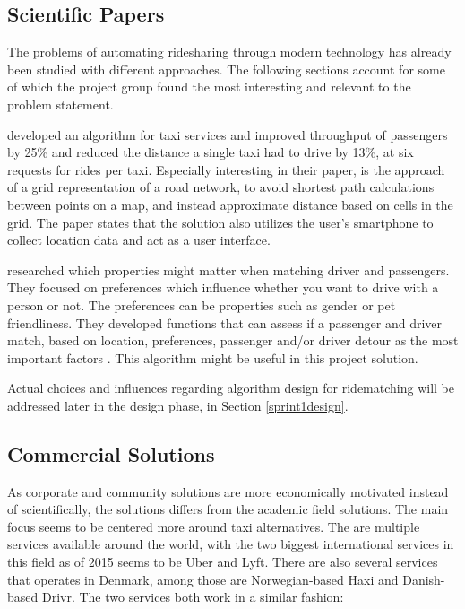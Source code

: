 \subsection{Scientific Papers}
The problems of automating ridesharing through modern technology has already been studied with different approaches.
The following sections account for some of which the project group found the most interesting and relevant to the problem statement. 


\citet{ShuoMa2013} developed an algorithm for taxi services and improved throughput of passengers by 25\% and reduced the distance a single taxi had to drive by 13\%, at six requests for rides per taxi.
Especially interesting in their paper, is the approach of a grid representation of a road network, to avoid shortest path calculations between points on a map, and instead approximate distance based on cells in the grid.
The paper states that the solution also utilizes the user's smartphone to collect location data and act as a user interface.

\citet{ghoseiri2011real} researched which properties might matter when matching driver and passengers.
They focused on preferences which influence whether you want to drive with a person or not.
The preferences can be properties such as gender or pet friendliness.
They developed functions that can assess if a passenger and driver match, based on location, preferences, passenger and/or driver detour as the most important factors \cite{ghoseiri2011real}.
This algorithm might be useful in this project solution.

Actual choices and influences regarding algorithm design for ridematching will be addressed later in the design phase, in Section \ref{sprint1design}.

\subsection{Commercial Solutions}
As corporate and community solutions are more economically motivated instead of scientifically, the solutions differs from the academic field solutions.
The main focus seems to be centered more around taxi alternatives.
The are multiple services available around the world, with the two biggest international services in this field as of 2015 seems to be Uber and Lyft\cite{ridehail}.
There are also several services that operates in Denmark, among those are Norwegian-based Haxi and Danish-based Drivr.
The two services both work in a similar fashion: 

